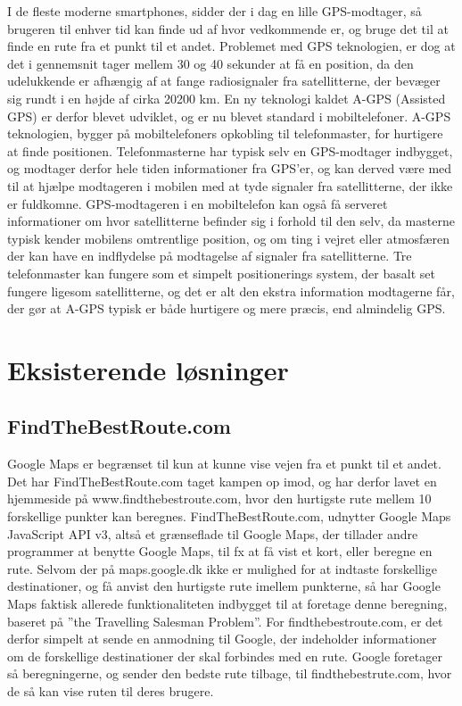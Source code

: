 I de fleste moderne smartphones, sidder der i dag en lille GPS-modtager, så brugeren til enhver tid kan finde ud af hvor vedkommende er, og bruge det til at finde en rute fra et punkt til et andet. Problemet med GPS teknologien, er dog at det i gennemsnit tager mellem 30 og 40 sekunder at få en position, da den udelukkende er afhængig af at fange radiosignaler fra satellitterne, der bevæger sig rundt i en højde af cirka 20200 km.  En ny teknologi kaldet A-GPS (Assisted GPS) er derfor blevet udviklet, og er nu blevet standard i mobiltelefoner. A-GPS teknologien, bygger på mobiltelefoners opkobling til telefonmaster, for hurtigere at finde positionen. Telefonmasterne har typisk selv en GPS-modtager indbygget, og modtager derfor hele tiden informationer fra GPS’er, og kan derved være med til at hjælpe modtageren i mobilen med at tyde signaler fra satellitterne, der ikke er fuldkomne. GPS-modtageren i en mobiltelefon kan også få serveret informationer om hvor satellitterne befinder sig i forhold til den selv, da masterne typisk kender mobilens omtrentlige position, og om ting i vejret eller atmosfæren der kan have en indflydelse på modtagelse af signaler fra satellitterne. 
Tre telefonmaster kan fungere som et simpelt positionerings system, der basalt set fungere ligesom satellitterne, og det er alt den ekstra information modtagerne får, der gør at A-GPS typisk er både hurtigere og mere præcis, end almindelig GPS.

\section{Eksisterende løsninger}
\subsection{FindTheBestRoute.com}
Google Maps er begrænset til kun at kunne vise vejen fra et punkt til et andet. Det har FindTheBestRoute.com taget kampen op imod, og har derfor lavet en hjemmeside på www.findthebestroute.com, hvor den hurtigste rute mellem 10 forskellige punkter kan beregnes. FindTheBestRoute.com, udnytter Google Maps JavaScript API v3, altså et grænseflade til Google Maps, der tillader andre programmer at benytte Google Maps, til fx at få vist et kort, eller beregne en rute. Selvom der på maps.google.dk ikke er mulighed for at indtaste forskellige destinationer, og få anvist den hurtigste rute imellem punkterne, så har Google Maps faktisk allerede funktionaliteten indbygget til at foretage denne beregning, baseret på ”the Travelling Salesman Problem”. For findthebestroute.com, er det derfor simpelt at sende en anmodning til Google, der indeholder informationer om de forskellige destinationer der skal forbindes med en rute. Google foretager så beregningerne, og sender den bedste rute tilbage, til findthebestrute.com, hvor de så kan vise ruten til deres brugere.


